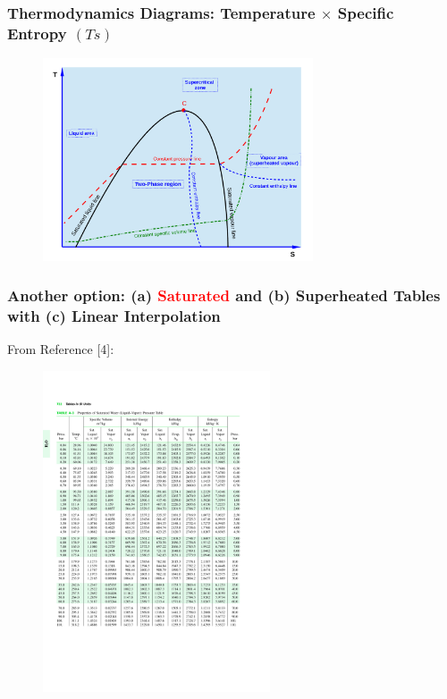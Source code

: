 \documentclass[10pt,compress,handout,ignorenonframetext]{beamer}
\newcommand{\red}{\textcolor{red}}
\begin{document}
\begin{frame}
 \frametitle{Thermodynamics Diagrams: Temperature $\times$ Specific Entropy $(Ts)$}
  \begin{center}
   \begin{figure}
      \includegraphics[width=8cm,height=7.cm,clip]{./Pics/TS_Diag_Schematics}
   \end{figure}
   \end{center}
\end{frame}

\begin{frame}
  \frametitle{Another option: (a) \red{Saturated} and (b) Superheated Tables with (c) Linear Interpolation}
\scriptsize{From Reference [4]:}\vspace{-.8cm}
   \begin{center}
   \begin{figure}
      \includegraphics[width=9.cm,height=9.5cm,clip]{./Pics/WaterSatTable}
   \end{figure}
   \end{center}
\end{frame}
\end{document}
